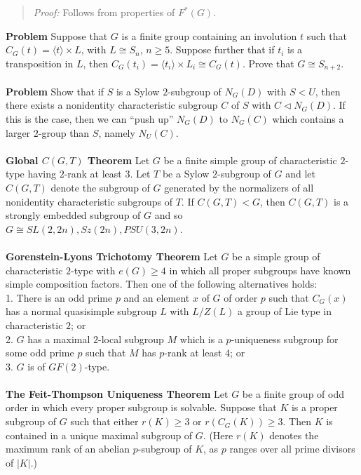 \begin{quote}
\emph{Proof:} Follows from properties of $F^*(G)$.
\end{quote}

{\bf Problem} Suppose that $G$ is a finite group containing an involution $t$ such that
$C_G(t) = \langle t \rangle \times L$, with $L \cong  S_n$, $n \ge  5$. Suppose
further that if $t_i$ is a transposition in $L$, then $C_G(t_i) = \langle t_i \rangle \times L_i \cong  C_G(t)$. Prove
that $G \cong  S_{n+2}$.
\\
\\
{\bf Problem} Show that if $S$ is a Sylow $2$-subgroup of $N_G(D)$ with $S<U$, then
there exists a nonidentity characteristic subgroup $C$ of $S$ with $C \lhd N_G(D)$.
If this is the case, then we can “push up” $N_G(D)$ to $N_G(C)$ which contains a
larger $2$-group than $S$, namely $N_U(C)$.
\\
\\
{\bf Global $C(G, T)$ Theorem} Let $G$ be a finite simple group of characteristic $2$-type
having $2$-rank at least $3$. Let $T$ be a Sylow $2$-subgroup of $G$ and let $C(G, T)$ denote
the subgroup of $G$ generated by the normalizers of all nonidentity characteristic
subgroups of $T$. If $C(G, T) < G$, then $C(G, T)$ is a strongly embedded subgroup of
$G$ and so $G \cong  SL(2, 2n), Sz(2n), PSU(3, 2n)$.
\\
\\
{\bf Gorenstein-Lyons Trichotomy Theorem} Let $G$ be a simple group of characteristic $2$-type with $e(G) \ge  4$ in which all proper subgroups have known simple
composition factors. Then one of the following alternatives holds:
\\
1. There is an odd prime $p$ and an element $x$ of $G$ of order $p$ such that $C_G(x)$
has a normal quasisimple subgroup $L$ with $L/Z(L)$ a group of Lie type in
characteristic $2$; or
\\
2. $G$ has a maximal $2$-local subgroup $M$ which is a $p$-uniqueness subgroup for
some odd prime $p$ such that $M$ has $p$-rank at least $4$; or
\\
3. $G$ is of $GF(2)$-type.
\\
\\
{\bf The Feit-Thompson Uniqueness Theorem} Let $G$ be a finite group of odd order in which every proper subgroup is solvable. Suppose that $K$ is a proper subgroup
of $G$ such that either $r(K) \geq 3$ or $r(C_G(K)) \ge 3$. Then $K$ is contained in a unique
maximal subgroup of $G$. (Here $r(K)$ denotes the maximum rank of an abelian $p$-subgroup of $K$, as $p$ ranges over all prime divisors of $|K|$.)
